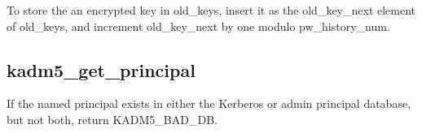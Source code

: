 To store the an encrypted key in old_keys, insert it as the
old_key_next element of old_keys, and increment old_key_next by one
modulo pw_history_num.

\subsection{kadm5_get_principal}

If the named principal exists in either the Kerberos or admin
principal database, but not both, return KADM5_BAD_DB.


